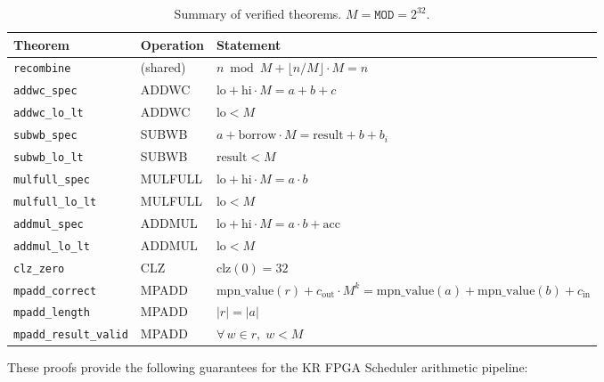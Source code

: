 \documentclass[11pt,a4paper]{article}
\begin{document}
\begin{table}[h]
\centering
\small
\begin{tabular}{@{}llp{6.8cm}@{}}
\toprule
\textbf{Theorem} & \textbf{Operation} & \textbf{Statement} \\
\midrule
\texttt{recombine} & (shared) & $n \bmod M + \lfloor n/M \rfloor \cdot M = n$ \\
\texttt{addwc\_spec} & ADDWC & $\mathrm{lo} + \mathrm{hi} \cdot M = a + b + c$ \\
\texttt{addwc\_lo\_lt} & ADDWC & $\mathrm{lo} < M$ \\
\texttt{subwb\_spec} & SUBWB & $a + \mathrm{borrow} \cdot M = \mathrm{result} + b + b_i$ \\
\texttt{subwb\_lo\_lt} & SUBWB & $\mathrm{result} < M$ \\
\texttt{mulfull\_spec} & MULFULL & $\mathrm{lo} + \mathrm{hi} \cdot M = a \cdot b$ \\
\texttt{mulfull\_lo\_lt} & MULFULL & $\mathrm{lo} < M$ \\
\texttt{addmul\_spec} & ADDMUL & $\mathrm{lo} + \mathrm{hi} \cdot M = a \cdot b + \mathrm{acc}$ \\
\texttt{addmul\_lo\_lt} & ADDMUL & $\mathrm{lo} < M$ \\
\texttt{clz\_zero} & CLZ & $\mathrm{clz}(0) = 32$ \\
\texttt{mpadd\_correct} & MPADD & $\mathrm{mpn\_value}(r) + c_{\mathrm{out}} \cdot M^k = \mathrm{mpn\_value}(a) + \mathrm{mpn\_value}(b) + c_{\mathrm{in}}$ \\
\texttt{mpadd\_length} & MPADD & $|r| = |a|$ \\
\texttt{mpadd\_result\_valid} & MPADD & $\forall\, w \in r,\; w < M$ \\
\bottomrule
\end{tabular}
\caption{Summary of verified theorems.  $M = \mathtt{MOD} = 2^{32}$.}
\label{tab:summary}
\end{table}

These proofs provide the following guarantees for the KR FPGA Scheduler
arithmetic pipeline:
\end{document}
